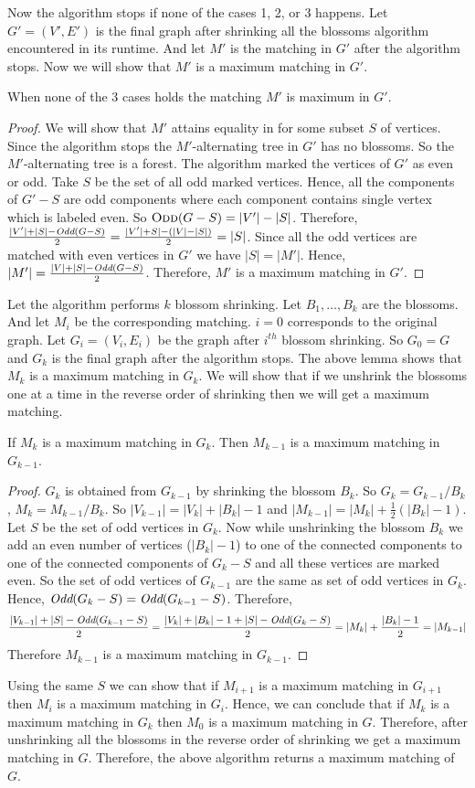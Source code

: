 Now the algorithm stops if none of the cases 1, 2, or 3 happens. Let $G'=(V',E')$ is the final graph after shrinking all the blossoms algorithm encountered in its runtime. And let $M'$ is the matching in $G'$ after the algorithm stops. Now we will show that $M'$ is a maximum matching in $G'$.
\begin{lemma}{}{}
	When none of the 3 cases holds the matching $M'$ is maximum in $G'$.
\end{lemma}
\begin{proof}
	We will show that $M'$ attains equality in  for some subset $S$ of vertices. Since the algorithm stops the $M'$-alternating tree in $G'$ has no blossoms. So the $M'$-alternating tree is a forest. The algorithm marked the vertices of $G'$ as even or odd. Take $S$ be the set of all odd marked vertices. Hence, all the components of $G'-S$ are odd components where each component contains single vertex which is labeled even. So $\textsc{Odd}(G-S)=|V'|-|S|$. Therefore, $\frac{|V'|+|S|-\emph{Odd}(G-S)}2=\frac{|V'|+S|-(|V|-|S|)}2=|S|$. Since all the odd vertices are matched with even vertices in $G'$  we have $|S|=|M'|$. Hence, $|M'|=\frac{|V|+|S|-\emph{Odd}(G-S)}2$. Therefore, $M'$ is a maximum matching in $G'$.
\end{proof}
Let the algorithm performs $k$ blossom shrinking. Let $B_1,\dots, B_k$ are the blossoms. And let $M_i$ be the corresponding matching. $i=0$ corresponds to the original graph. Let $G_i=(V_i,E_i)$ be the graph after $i^{th}$ blossom shrinking. So $G_0=G$ and $G_k$ is the final graph after the algorithm stops. The above lemma shows that $M_k$ is a maximum matching in $G_k$. We will show that if we unshrink the blossoms one at a time in the reverse order of shrinking then we will get a maximum matching.
\begin{lemma}{}{}
	If $M_{k}$ is a maximum matching in $G_k$. Then $M_{k-1}$ is a maximum matching in $G_{k-1}$.
\end{lemma}
\begin{proof}
	$G_k$ is obtained from $G_{k-1}$ by shrinking the blossom $B_k$. So $G_k=G_{k-1}/B_{k}$, $M_k=M_{k-1}/B_k$. So $|V_{k-1}|=|V_k|+|B_k|-1$ and $|M_{k-1}|=|M_k|+\frac12(|B_k|-1)$. Let $S$ be the set of odd vertices in $G_k$. Now while unshrinking the blossom $B_k$  we add an even number of vertices ($|B_k|-1$) to one of the connected components to one of the connected components of $G_k-S$ and all these vertices are marked even. So the set of odd vertices of $G_{k-1}$ are the same as set of odd vertices in $G_k$. Hence, $\emph{Odd}(G_k-S)=\emph{Odd}(G_{k-1}-S)$. Therefore, $$\frac{|V_{k-1}|+|S|-\emph{Odd}(G_{k-1}-S)}2=\frac{|V_k|+|B_k|-1+|S|-\emph{Odd}(G_{k}-S)}2=|M_k|+\frac{|B_k|-1}2=|M_{k-1}|$$Therefore $M_{k-1}$ is a maximum matching in $G_{k-1}$.
\end{proof}Using the same $S$ we can show that if $M_{i+1}$ is a maximum matching in $G_{i+1}$ then $M_i$ is a maximum matching in $G_i$. Hence, we can conclude that if $M_k$ is a maximum matching in $G_k$ then $M_0$ is a maximum matching in $G$. Therefore, after unshrinking all the blossoms in the reverse order of shrinking we get a maximum matching in $G$. Therefore, the above algorithm returns a maximum matching of $G$.

